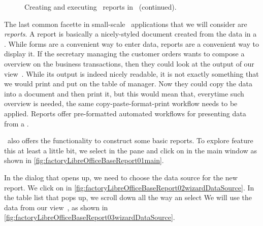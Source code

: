 %
%
\begin{figure}%
\ContinuedFloat%
\centering%
%
%
%
\floatSep%
%
%
%
\floatRowSep%
%
%
%
\caption{Creating and executing \db\ reports in \libreofficeBase~(continued).}%
\label{fig:factoryLibreOfficeBaseReportE}%
\end{figure}%
%
%
The last common facette in small-scale \db\ applications that we will consider are \emph{reports}.
A report is basically a nicely-styled document created from the data in a \db.
While forms are a convenient way to enter data, reports are a convenient way to display it.
If the secretary managing the customer orders wants to compose a overview on the business transactions, then they could look at the output of our view~.
While its output is indeed nicely readable, it is not exactly something that we would print and put on the table of manager.
Now they could copy the data into a document and then print it, but this would mean that, everytime such overview is needed, the same copy-paste-format-print workflow needs to be applied.
Reports offer pre-formatted automated workflows for presenting data from a \db.

\libreofficeBase\ also offers the functionality to construct some basic reports.
To explore feature this at least a little bit, we select  in the  pane and click on  in the \libreofficeBase main window as shown in \cref{fig:factoryLibreOfficeBaseReport01main}.

In the dialog that opens up, we need to choose the data source for the new report.
We click on  in \cref{fig:factoryLibreOfficeBaseReport02wizardDataSource}.
In the table list that pops up, we scroll down all the way an select 
We will use the data from our view~, as shown in \cref{fig:factoryLibreOfficeBaseReport03wizardDataSource}.

